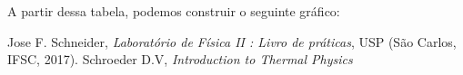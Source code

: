 \documentclass[a4paper]{ltxdoc}
\numberwithin{equation}{section}
\begin{document}
\vspace{\baselineskip}

A partir dessa tabela, podemos construir o seguinte gráfico:

\vspace{\baselineskip}

\noindent
\begin{minipage}{\linewidth}
\label{fig:risco1}
\end{minipage}

\vspace{\baselineskip}






 \vspace{\baselineskip}
 
\begin{thebibliography}{9}
 Jose F. Schneider, \textit{Laboratório de Física II : Livro de práticas}, USP (São Carlos, IFSC, 2017).
 Schroeder D.V, \textit{Introduction to Thermal Physics}
\end{thebibliography}
\end{document}
